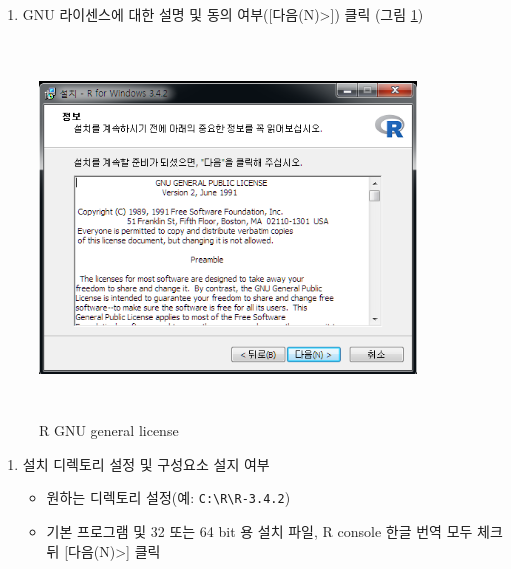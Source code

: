 \documentclass[12pt,a4paper]{book}
\providecommand{\tightlist}{%
  \setlength{\itemsep}{0pt}\setlength{\parskip}{0pt}}
\begin{document}
\begin{enumerate}
\def\labelenumi{\arabic{enumi}.}
\setcounter{enumi}{8}
\tightlist
\item
  GNU 라이센스에 대한 설명 및 동의 여부({[}다음(N)\textgreater{}{]})
  클릭 (그림 \ref{fig:R-install-07})
\end{enumerate}

\begin{figure}[h]
{
  \centering
  \includegraphics[width = 10cm, height = 10cm]{Figures/R-install-F02.png}
  \caption[R GNU general license]{R GNU general license}\label{fig:R-install-07}
}
\end{figure}

\begin{enumerate}
\def\labelenumi{\arabic{enumi}.}
\setcounter{enumi}{9}
\tightlist
\item
  설치 디렉토리 설정 및 구성요소 설지 여부

  \begin{itemize}
  \tightlist
  \item
    원하는 디렉토리 설정(예:
    \texttt{C:\textbackslash{}R\textbackslash{}R-3.4.2})
  \item
    기본 프로그램 및 32 또는 64 bit 용 설치 파일, R console 한글 번역
    모두 체크 뒤 {[}다음(N)\textgreater{}{]} 클릭
  \end{itemize}
\end{enumerate}
\end{document}

